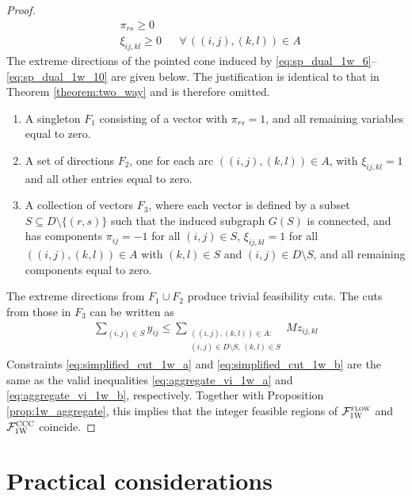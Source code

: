 \documentclass[10pt]{article}
\newcommand{\drivevar}[2]{y_{#1#2}}
\newcommand{\countvar}[4]{z_{#1#2,#3#4}}
\newcommand{\validdriveset}{D}
\newcommand{\grid}{G}
\newcommand{\gridarcset}{A}
\theoremstyle{definition}
\begin{document}
\begin{proof}
\begin{align}
    & \pi_{rs} \geq 0 && \label{eq:sp_dual_1w_9.5} \\
     & \xi_{ij, kl} \geq 0 && \forall \, ((i,j), (k,l)) \in \gridarcset \label{eq:sp_dual_1w_10} 
\end{align}
The extreme directions of the pointed cone induced by \eqref{eq:sp_dual_1w_6}--\eqref{eq:sp_dual_1w_10} are given below. The justification is identical to that in Theorem \ref{theorem:two_way} and is therefore omitted.
\begin{enumerate}
\item A singleton $F_1$ consisting of a vector with $\pi_{rs} = 1$, and all remaining variables equal to zero.
\item A set of directions $F_2$, one for each arc $((i,j),(k,l)) \in \gridarcset$, with $\xi_{ij,kl} = 1$ and all other entries equal to zero.
\item A collection of vectors $F_3$, where each vector is defined by a subset 
$S \subseteq \validdriveset \setminus \{(r,s)\}$ such that the induced subgraph 
$\grid(S)$ is connected, and has components 
$\pi_{ij} = -1$ for all $(i,j) \in S$, 
$\xi_{ij,kl} = 1$ for all $((i,j),(k,l)) \in \gridarcset$ with $(k,l) \in S$ and $(i,j) \in \validdriveset \setminus S$, 
and all remaining components equal to zero.
\end{enumerate}
The extreme directions from $F_1 \cup F_2$ produce trivial feasibility cuts. The cuts from those in $F_3$ can be written as
\begin{align}
\sum_{(i,j) \in S} \drivevar{i}{j} \leq  \sum_{\substack{
  ((i,j),(k,l)) \in \gridarcset:\\
  (i,j) \in D \setminus S,\,
  (k,l) \in S
}} M \countvar{i}{j}{k}{l}  \label{eq:simplified_cut_1w_b}
\end{align}
Constraints \eqref{eq:simplified_cut_1w_a} and \eqref{eq:simplified_cut_1w_b} are the same as the valid inequalities \eqref{eq:aggregate_vi_1w_a} and \eqref{eq:aggregate_vi_1w_b}, respectively. Together with Proposition \ref{prop:1w_aggregate}, this implies that the integer feasible regions of $\mathcal{F}_{\textsc{1W}}^{\textsc{flow}}$ and $\mathcal{F}_{\textsc{1W}}^{\textsc{CCC}}$ coincide.
\end{proof}

\section{Practical considerations}
\label{sec:practical_considerations}
\end{document}
